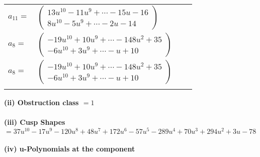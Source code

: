 \documentclass[1p]{elsarticle_modified}
\theoremstyle{definition}
\begin{document}
\begin{tabular}{m{7pt} m{180pt} m{7pt} m{180pt} }
\flushright $a_{11}=$&$\begin{pmatrix}13 u^{10}-11 u^9+\cdots-15 u-16\\8 u^{10}-5 u^9+\cdots-2 u-14\end{pmatrix}$ \\
\flushright $a_{8}=$&$\begin{pmatrix}-19 u^{10}+10 u^9+\cdots-148 u^2+35\\-6 u^{10}+3 u^9+\cdots- u+10\end{pmatrix}$\\ \flushright $a_{8}=$&$\begin{pmatrix}-19 u^{10}+10 u^9+\cdots-148 u^2+35\\-6 u^{10}+3 u^9+\cdots- u+10\end{pmatrix}$\\&\end{tabular}
\flushleft \textbf{(ii) Obstruction class $= 1$}\\~\\
\flushleft \textbf{(iii) Cusp Shapes $= 37 u^{10}-17 u^9-120 u^8+48 u^7+172 u^6-57 u^5-289 u^4+70 u^3+294 u^2+3 u-78$}\\~\\
\newpage\renewcommand{\arraystretch}{1}
\flushleft \textbf{(iv) u-Polynomials at the component}\newline \\
\end{document}
